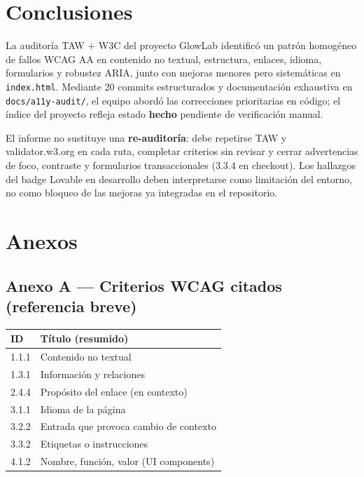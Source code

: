 \documentclass[11pt,a4paper]{article}
\begin{document}
\section{Conclusiones}

La auditoría TAW + W3C del proyecto GlowLab identificó un patrón homogéneo de fallos WCAG AA en contenido no textual, estructura, enlaces, idioma, formularios y robustez ARIA, junto con mejoras menores pero sistemáticas en \texttt{index.html}. Mediante 20 commits estructurados y documentación exhaustiva en \texttt{docs/a11y-audit/}, el equipo abordó las correcciones prioritarias en código; el índice del proyecto refleja estado \textbf{hecho} pendiente de verificación manual.

El informe no sustituye una \textbf{re-auditoría}: debe repetirse TAW y validator.w3.org en cada ruta, completar criterios sin revisar y cerrar advertencias de foco, contraste y formularios transaccionales (3.3.4 en checkout). Los hallazgos del badge Lovable en desarrollo deben interpretarse como limitación del entorno, no como bloqueo de las mejoras ya integradas en el repositorio.

\section{Anexos}

\subsection{Anexo A --- Criterios WCAG citados (referencia breve)}

\begin{center}
\small
\begin{tabular}{@{}ll@{}}
\toprule
\textbf{ID} & \textbf{Título (resumido)} \\
\midrule
1.1.1 & Contenido no textual \\
1.3.1 & Información y relaciones \\
2.4.4 & Propósito del enlace (en contexto) \\
3.1.1 & Idioma de la página \\
3.2.2 & Entrada que provoca cambio de contexto \\
3.3.2 & Etiquetas o instrucciones \\
4.1.2 & Nombre, función, valor (UI components) \\
\bottomrule
\end{tabular}
\end{center}
\end{document}
